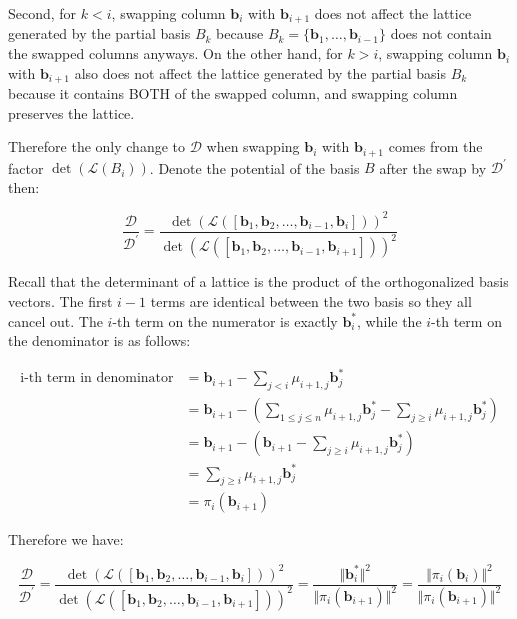 \documentclass[letterpaper,12pt]{article}
\begin{document}
Second, for $k < i$, swapping column $\mathbf{b}_i$ with $\mathbf{b}_{i+1}$ does not affect the lattice generated by the partial basis $B_k$ because $B_k = \{\mathbf{b}_1, \ldots, \mathbf{b}_{i-1}\}$ does not contain the swapped columns anyways. On the other hand, for $k > i$, swapping column $\mathbf{b}_i$ with $\mathbf{b}_{i+1}$ also does not affect the lattice generated by the partial basis $B_k$ because it contains BOTH of the swapped column, and swapping column preserves the lattice.

Therefore the only change to $\mathcal{D}$ when swapping $\mathbf{b}_i$ with $\mathbf{b}_{i+1}$ comes from the factor $\det(\mathcal{L}(B_i))$. Denote the potential of the basis $B$ after the swap by $\mathcal{D}^\prime$ then:

$$
\frac{\mathcal{D}}{\mathcal{D}^\prime} = \frac{
    \det(\mathcal{L}([\mathbf{b}_1, \mathbf{b}_2, \ldots, \mathbf{b}_{i-1}, \mathbf{b}_{i}]))^2
}{
    \det(\mathcal{L}([\mathbf{b}_1, \mathbf{b}_2, \ldots, \mathbf{b}_{i-1}, \mathbf{b}_{i+1}]))^2
}
$$

Recall that the determinant of a lattice is the product of the orthogonalized basis vectors. The first $i-1$ terms are identical between the two basis so they all cancel out. The $i$-th term on the numerator is exactly $\mathbf{b}_i^\ast$, while the $i$-th term on the denominator is as follows:

$$
\begin{aligned}
\text{i-th term in denominator} &= \mathbf{b}_{i+1} - \sum_{j < i} \mu_{i+1, j}\mathbf{b}_j^\ast \\
&= \mathbf{b}_{i+1} - (\sum_{1 \leq j \leq n} \mu_{i+1, j}\mathbf{b}_j^\ast  - \sum_{j \geq i} \mu_{i+1, j}\mathbf{b}_j^\ast) \\
&= \mathbf{b}_{i+1} - (\mathbf{b}_{i+1}  - \sum_{j \geq i} \mu_{i+1, j}\mathbf{b}_j^\ast) \\
&= \sum_{j \geq i} \mu_{i+1, j}\mathbf{b}_j^\ast \\
&= \pi_i(\mathbf{b}_{i+1})
\end{aligned}
$$

Therefore we have:

$$
\frac{\mathcal{D}}{\mathcal{D}^\prime} = \frac{
    \det(\mathcal{L}([\mathbf{b}_1, \mathbf{b}_2, \ldots, \mathbf{b}_{i-1}, \mathbf{b}_{i}]))^2
}{
    \det(\mathcal{L}([\mathbf{b}_1, \mathbf{b}_2, \ldots, \mathbf{b}_{i-1}, \mathbf{b}_{i+1}]))^2
} = \frac{\Vert\mathbf{b}_i^\ast\Vert^2}{\Vert\pi_i(\mathbf{b}_{i+1})\Vert^2}
= \frac{\Vert\pi_i(\mathbf{b}_{i})\Vert^2}{\Vert\pi_i(\mathbf{b}_{i+1})\Vert^2}
$$
\end{document}
